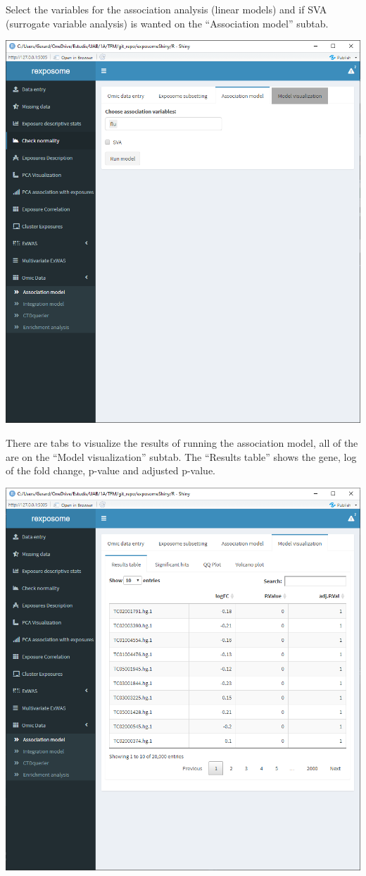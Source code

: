 \documentclass[
]{book}
\begin{document}
Select the variables for the association analysis (linear models) and if SVA (surrogate variable analysis) is wanted on the ``Association model'' subtab.

\includegraphics{images/analysis9_4.png}

There are tabs to visualize the results of running the association model, all of the are on the ``Model visualization'' subtab. The ``Results table'' shows the gene, log of the fold change, p-value and adjusted p-value.

\includegraphics{images/analysis9_5.png}
\end{document}
